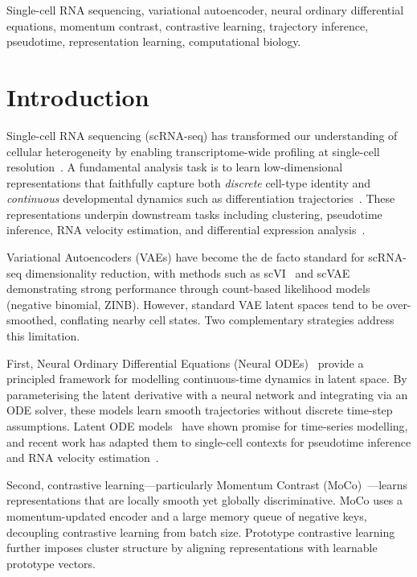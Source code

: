 \documentclass[journal]{IEEEtran}
\begin{document}
\begin{IEEEkeywords}
Single-cell RNA sequencing, variational autoencoder, neural ordinary differential equations, momentum contrast, contrastive learning, trajectory inference, pseudotime, representation learning, computational biology.
\end{IEEEkeywords}

\section{Introduction}
\label{sec:introduction}

Single-cell RNA sequencing (scRNA-seq) has transformed our understanding of cellular heterogeneity by enabling transcriptome-wide profiling at single-cell resolution~\cite{tang2009mrna}. A fundamental analysis task is to learn low-dimensional representations that faithfully capture both \textit{discrete} cell-type identity and \textit{continuous} developmental dynamics such as differentiation trajectories~\cite{kiselev2019challenges,trapnell2014dynamics}. These representations underpin downstream tasks including clustering, pseudotime inference, RNA velocity estimation, and differential expression analysis~\cite{wolf2018scanpy}.

Variational Autoencoders (VAEs) have become the de facto standard for scRNA-seq dimensionality reduction, with methods such as scVI~\cite{lopez2018deep} and scVAE~\cite{gronbech2020scvae} demonstrating strong performance through count-based likelihood models (negative binomial, ZINB). However, standard VAE latent spaces tend to be over-smoothed, conflating nearby cell states. Two complementary strategies address this limitation.

First, Neural Ordinary Differential Equations (Neural ODEs)~\cite{chen2018neural} provide a principled framework for modelling continuous-time dynamics in latent space. By parameterising the latent derivative with a neural network and integrating via an ODE solver, these models learn smooth trajectories without discrete time-step assumptions. Latent ODE models~\cite{rubanova2019latent} have shown promise for time-series modelling, and recent work has adapted them to single-cell contexts for pseudotime inference and RNA velocity estimation~\cite{fu2025panode}.

Second, contrastive learning---particularly Momentum Contrast (MoCo)~\cite{he2020momentum}---learns representations that are locally smooth yet globally discriminative. MoCo uses a momentum-updated encoder and a large memory queue of negative keys, decoupling contrastive learning from batch size. Prototype contrastive learning~\cite{li2021prototypical} further imposes cluster structure by aligning representations with learnable prototype vectors.
\end{document}

